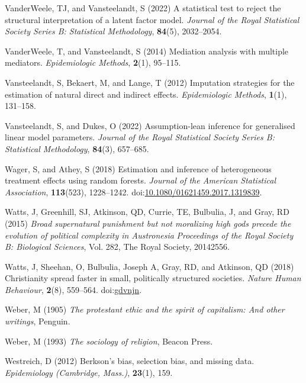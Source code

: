 \documentclass[
  singlecolumn]{article}
\newlength{\cslhangindent}
\newenvironment{CSLReferences}[2] %
 {\begin{list}{}{%
  \setlength{\itemindent}{0pt}
  \setlength{\leftmargin}{0pt}
  \setlength{\parsep}{0pt}
  \ifodd #1
   \setlength{\leftmargin}{\cslhangindent}
   \setlength{\itemindent}{-1\cslhangindent}
  \fi
  \setlength{\itemsep}{#2\baselineskip}}}
 {\end{list}}
\begin{document}
\begin{CSLReferences}{1}{0}
VanderWeele, TJ, and Vansteelandt, S (2022) A statistical test to reject
the structural interpretation of a latent factor model. \emph{Journal of
the Royal Statistical Society Series B: Statistical Methodology},
\textbf{84}(5), 2032--2054.

VanderWeele, T, and Vansteelandt, S (2014) Mediation analysis with
multiple mediators. \emph{Epidemiologic Methods}, \textbf{2}(1),
95--115.

Vansteelandt, S, Bekaert, M, and Lange, T (2012) Imputation strategies
for the estimation of natural direct and indirect effects.
\emph{Epidemiologic Methods}, \textbf{1}(1), 131--158.

Vansteelandt, S, and Dukes, O (2022) Assumption-lean inference for
generalised linear model parameters. \emph{Journal of the Royal
Statistical Society Series B: Statistical Methodology}, \textbf{84}(3),
657--685.

Wager, S, and Athey, S (2018) Estimation and inference of heterogeneous
treatment effects using random forests. \emph{Journal of the American
Statistical Association}, \textbf{113}(523), 1228--1242.
doi:\href{https://doi.org/10.1080/01621459.2017.1319839}{10.1080/01621459.2017.1319839}.

Watts, J, Greenhill, SJ, Atkinson, QD, Currie, TE, Bulbulia, J, and
Gray, RD (2015) \emph{Broad supernatural punishment but not moralizing
high gods precede the evolution of political complexity in
{A}ustronesia} \emph{Proceedings of the Royal Society B: Biological
Sciences}, Vol. 282, The Royal Society, 20142556.

Watts, J, Sheehan, O, Bulbulia, Joseph A, Gray, RD, and Atkinson, QD
(2018) Christianity spread faster in small, politically structured
societies. \emph{Nature Human Behaviour}, \textbf{2}(8), 559--564.
doi:\href{https://doi.org/gdvnjn}{gdvnjn}.

Weber, M (1905) \emph{The protestant ethic and the spirit of capitalism:
And other writings}, Penguin.

Weber, M (1993) \emph{The sociology of religion}, Beacon Press.

Westreich, D (2012) Berkson's bias, selection bias, and missing data.
\emph{Epidemiology (Cambridge, Mass.)}, \textbf{23}(1), 159.


\end{CSLReferences}
\end{document}
